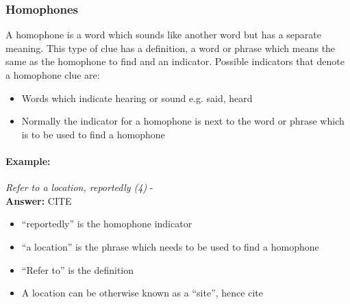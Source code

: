 \subsubsection{Homophones}

A homophone is a word which sounds like another word but has a separate meaning.
This type of clue has a definition, a word or phrase which means the same as the
homophone to find and an indicator. Possible indicators that denote a homophone
clue are:

\begin{itemize} 
    \item Words which indicate hearing or sound e.g. said, heard 
    \item Normally the indicator for a homophone is next to the word or phrase
    which is to be used to find a homophone  
\end{itemize}

\paragraph{Example:} \emph{Refer to a location, reportedly (4)} - \citep{shuchiHomophone08} \\
\textbf{Answer:} CITE 

\begin{itemize}
    \item ``reportedly'' is the homophone indicator 
    \item ``a location'' is the phrase which needs to be used to find a homophone 
    \item ``Refer to'' is the definition 
    \item A location can be otherwise known as a ``site'', hence cite 
\end{itemize}